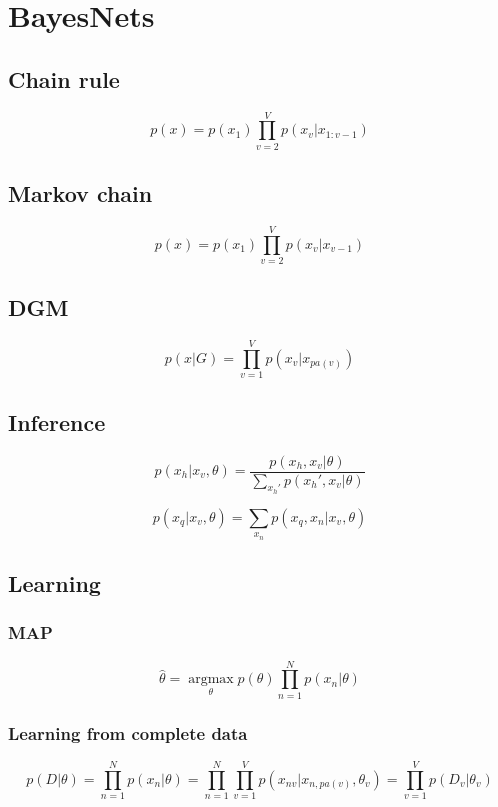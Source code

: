 \chapter{BayesNets}
\section{Chain rule}
\begin{equation}
p(x) = p(x_1)\prod_{v = 2}^Vp(x_v|x_{1:v-1})
\end{equation}

\section{Markov chain}
\begin{equation}
p(x) = p(x_1)\prod_{v = 2}^Vp(x_v|x_{v-1})
\end{equation}

\section{DGM}
\begin{equation}
p(x|G) = \prod_{v=1}^Vp(x_v|x_{pa(v)})
\label{bayes_net}
\end{equation}

\section{Inference}
\begin{equation}
p(x_h|x_v,\theta) = 
\frac{p(x_h, x_v|\theta)}
{\sum_{x_h'}p(x_h', x_v|\theta)}
\end{equation}

\begin{equation}
p(x_q|x_v,\theta) = \sum_{x_n}p(x_q, x_n|x_v, \theta)
\end{equation}

\section{Learning}
\subsection{MAP}
\begin{equation}
\hat{\theta} =
\underset{\theta}{\operatorname{argmax}}
p(\theta)\prod_{n=1}^Np(x_n|\theta)
\end{equation}
\subsection{Learning from complete data}
\begin{equation}
p(D|\theta) = \prod_{n=1}^Np(x_n|\theta)
= \prod_{n=1}^N\prod_{v=1}^Vp(x_{nv}|x_{n, pa(v)}, \theta_v)
= \prod_{v=1}^Vp(D_v|\theta_v)
\end{equation}


